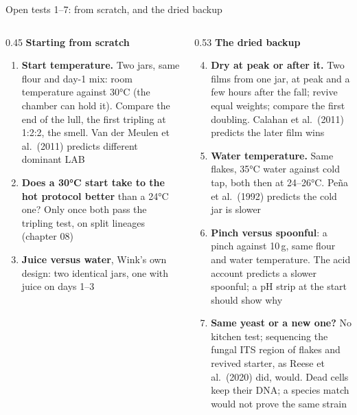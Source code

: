 \documentclass[aspectratio=169,11pt]{beamer}
\begin{document}
\begin{frame}{Open tests 1--7: from scratch, and the dried backup \untested}
  \scriptsize
  \begin{columns}[T]
    \begin{column}{0.45\textwidth}
      \textbf{\color{crust}Starting from scratch}
      \begin{enumerate}
        \item \textbf{Start temperature.} Two jars, same flour and day-1 mix: room temperature against 30°C (the chamber can hold it). Compare the end of the lull, the first tripling at 1:2:2, the smell. Van der Meulen et al.\ (2011) predicts different dominant LAB
        \item \textbf{Does a 30°C start take to the hot protocol better} than a 24°C one? Only once both pass the tripling test, on split lineages (chapter 08)
        \item \textbf{Juice versus water}, Wink's own design: two identical jars, one with juice on days 1--3
      \end{enumerate}
    \end{column}
    \begin{column}{0.53\textwidth}
      \textbf{\color{crust}The dried backup}
      \begin{enumerate}
        \setcounter{enumi}{3}
        \item \textbf{Dry at peak or after it.} Two films from one jar, at peak and a few hours after the fall; revive equal weights; compare the first doubling. Calahan et al.\ (2011) predicts the later film wins
        \item \textbf{Water temperature.} Same flakes, 35°C water against cold tap, both then at 24--26°C. Peña et al.\ (1992) predicts the cold jar is slower
        \item \textbf{Pinch versus spoonful}: a pinch against 10\,g, same flour and water temperature. The acid account predicts a slower spoonful; a pH strip at the start should show why
        \item \textbf{Same yeast or a new one?} No kitchen test; sequencing the fungal ITS region of flakes and revived starter, as Reese et al.\ (2020) did, would. Dead cells keep their DNA; a species match would not prove the same strain
      \end{enumerate}
    \end{column}
  \end{columns}
\end{frame}
\end{document}
